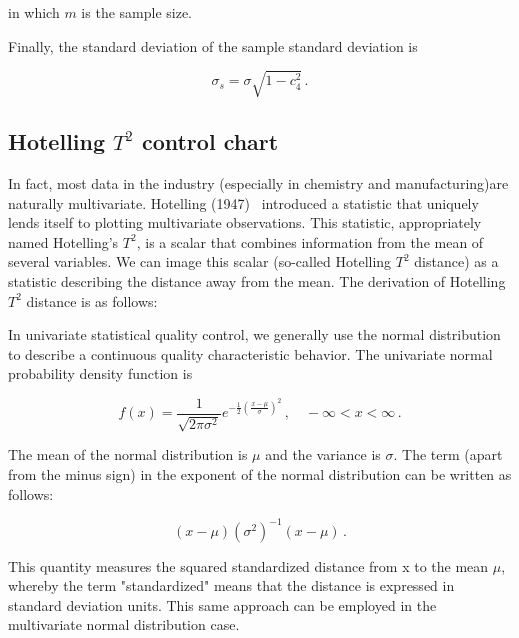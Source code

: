 in which $m$ is the sample size.

Finally, the standard deviation of the sample standard deviation is

\begin{equation}
    \sigma_{s}=\sigma \sqrt{1-c_{4}^{2}}\,.
    \label{equ:sigma_s}
\end{equation}

\subsection{Hotelling $T^{2}$ control chart}
In fact, most data in the industry (especially in chemistry and manufacturing)are naturally multivariate. Hotelling (1947) ~\nocite{hotteling1947multivariate}introduced a statistic that uniquely lends itself to plotting multivariate observations. This statistic, appropriately named Hotelling's $T^{2}$, is a scalar that combines information from the mean of several variables. We can image this scalar (so-called Hotelling $T^{2}$ distance) as a statistic describing the distance away from the mean. The derivation of Hotelling $T^{2}$ distance is as follows:

In univariate statistical quality control, we generally use the normal distribution to describe a continuous quality characteristic behavior. The univariate normal probability density function is


\begin{equation}
    f(x)=\frac{1}{\sqrt{2 \pi \sigma^{2}}} e^{-\frac{1}{2}\left(\frac{x-\mu}{\sigma}\right)^{2}}\,, \quad-\infty<x<\infty\,.
    \label{equ:normal_distribution}
\end{equation}

The mean of the normal distribution is $\mu$ and the variance is $\sigma$. The term (apart from the minus sign) in the exponent of the normal distribution can be written as follows:

\begin{equation}
    (x-\mu)\left(\sigma^{2}\right)^{-1}(x-\mu)\,.
    \label{equ:normal_distribution_part}
\end{equation}

This quantity measures the squared standardized distance from x to the mean $\mu$, whereby the term "standardized" means that the distance is expressed in standard deviation units. This same approach can be employed in the multivariate normal distribution case. 

